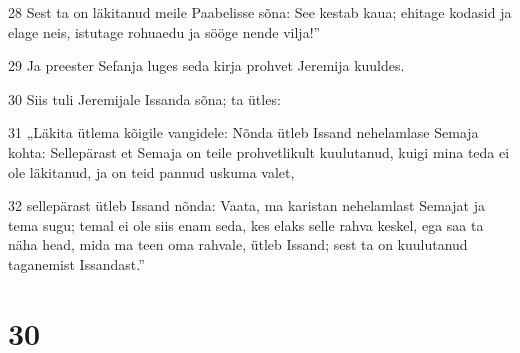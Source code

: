 \par 28 Sest ta on läkitanud meile Paabelisse sõna: See kestab kaua; ehitage kodasid ja elage neis, istutage rohuaedu ja sööge nende vilja!”
\par 29 Ja preester Sefanja luges seda kirja prohvet Jeremija kuuldes.
\par 30 Siis tuli Jeremijale Issanda sõna; ta ütles:
\par 31 „Läkita ütlema kõigile vangidele: Nõnda ütleb Issand nehelamlase Semaja kohta: Sellepärast et Semaja on teile prohvetlikult kuulutanud, kuigi mina teda ei ole läkitanud, ja on teid pannud uskuma valet,
\par 32 sellepärast ütleb Issand nõnda: Vaata, ma karistan nehelamlast Semajat ja tema sugu; temal ei ole siis enam seda, kes elaks selle rahva keskel, ega saa ta näha head, mida ma teen oma rahvale, ütleb Issand; sest ta on kuulutanud taganemist Issandast.”

\chapter{30}

